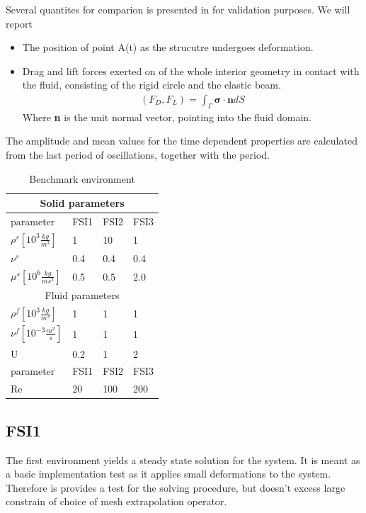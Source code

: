 Several quantites for comparion is presented in \cite{Hron2006} for validation purposes. We will report
\begin{itemize}
\item The position of point A(t) as the strucutre undergoes deformation.
\item Drag and lift forces exerted on of the whole interior geometry in contact with the fluid, consisting of the rigid circle and the elastic beam. 
\begin{align*}
(F_D, F_L) = \int_{\Gamma} \mathbf{\sigma} \cdot \mathbf{n} dS
\end{align*}
Where \textbf{n} is the unit normal vector, pointing into the fluid domain. 
\end{itemize}
The amplitude and mean values for the time dependent properties are calculated from the last period of oscillations, together with the period. 

\begin{table}[h]
\centering
\caption{Benchmark environment}
\label{my-label}
\begin{tabular}{ |p{3cm}||p{3cm}|p{3cm}|p{3cm}|  }
 \hline
 \multicolumn{4}{|c|}{Solid parameters} \\
 \hline
 parameter              & FSI1 & FSI2 & FSI3 \\
 \hline
 $\rho^s [10^{3} \frac{kg}{m^3}]$ & 1    & 10   & 1    \\
$\nu^s$ & 0.4  & 0.4  & 0.4  \\
$\mu^s  [10^{6}\frac{kg}{ms^2}]$  & 0.5  & 0.5  & 2.0  \\
 \hline
 \multicolumn{4}{|c|}{Fluid parameters} \\
 \hline
$\rho^f [10^{3}\frac{kg}{m^3}]$ & 1    & 1    & 1    \\
$\nu^f  [10^{-3}\frac{m^2}{s}]$  & 1    & 1    & 1    \\
U                      & 0.2  & 1    & 2    \\
parameter              & FSI1 & FSI2 & FSI3 \\
Re                     & 20   & 100  & 200 \\
\hline
\end{tabular}
\end{table}


\subsection{FSI1}
The first environment yields a steady state solution for the system. It is meant as a basic implementation test as it applies small deformations to the system. Therefore is provides a test for the solving procedure, but doesn't excess large constrain of choice of mesh extrapolation operator. 

